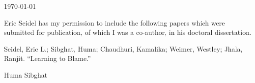\documentclass{article}
\begin{document}
\today

Eric Seidel has my permission to include the following papers which were
submitted for publication, of which I was a co-author, in his doctoral
dissertation.

Seidel, Eric L.; Sibghat, Huma; Chaudhuri, Kamalika; Weimer, Westley; Jhala, Ranjit. ``Learning to Blame.''

\baselineskip
Huma Sibghat
\end{document}
